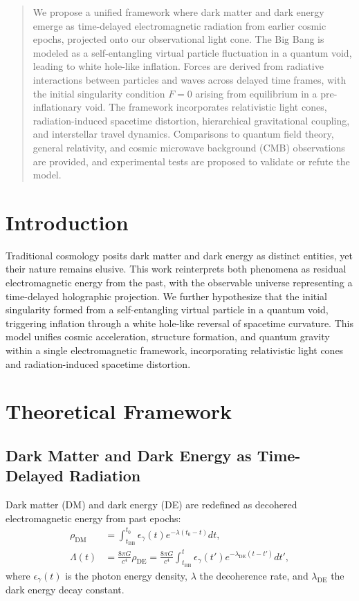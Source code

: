 \documentclass[12pt, a4paper]{article}
\begin{document}
\begin{abstract}
We propose a unified framework where dark matter and dark energy emerge as time-delayed electromagnetic radiation from earlier cosmic epochs, projected onto our observational light cone. The Big Bang is modeled as a self-entangling virtual particle fluctuation in a quantum void, leading to white hole-like inflation. Forces are derived from radiative interactions between particles and waves across delayed time frames, with the initial singularity condition \( F = 0 \) arising from equilibrium in a pre-inflationary void. The framework incorporates relativistic light cones, radiation-induced spacetime distortion, hierarchical gravitational coupling, and interstellar travel dynamics. Comparisons to quantum field theory, general relativity, and cosmic microwave background (CMB) observations are provided, and experimental tests are proposed to validate or refute the model.
\end{abstract}

\section{Introduction}
Traditional cosmology posits dark matter and dark energy as distinct entities, yet their nature remains elusive. This work reinterprets both phenomena as residual electromagnetic energy from the past, with the observable universe representing a time-delayed holographic projection. We further hypothesize that the initial singularity formed from a self-entangling virtual particle in a quantum void, triggering inflation through a white hole-like reversal of spacetime curvature. This model unifies cosmic acceleration, structure formation, and quantum gravity within a single electromagnetic framework, incorporating relativistic light cones and radiation-induced spacetime distortion.

\section{Theoretical Framework}
\subsection{Dark Matter and Dark Energy as Time-Delayed Radiation}
Dark matter (DM) and dark energy (DE) are redefined as decohered electromagnetic energy from past epochs:
\begin{align}
\rho_{\text{DM}} &= \int_{t_{\text{BB}}}^{t_0} \epsilon_{\gamma}(t) e^{-\lambda (t_0 - t)} dt, \label{eq:dm} \\
\Lambda(t) &= \frac{8\pi G}{c^4} \rho_{\text{DE}} = \frac{8\pi G}{c^4} \int_{t_{\text{BB}}}^{t} \epsilon_{\gamma}(t') e^{-\lambda_{\text{DE}} (t - t')} dt', \label{eq:de}
\end{align}
where \( \epsilon_{\gamma}(t) \) is the photon energy density, \( \lambda \) the decoherence rate, and \( \lambda_{\text{DE}} \) the dark energy decay constant.
\end{document}

